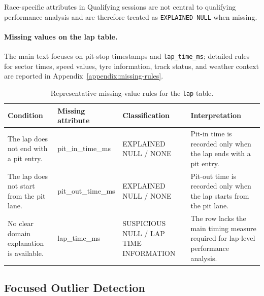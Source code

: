 \documentclass[11pt,a4paper]{article}
\begin{document}
	
	Race-specific attributes in Qualifying sessions are not central to qualifying performance analysis and are therefore treated as \texttt{EXPLAINED NULL} when missing.
	
	\paragraph{Missing values on the lap table.}
	The main text focuses on pit-stop timestamps and \texttt{lap\_time\_ms}; detailed rules for sector times, speed values, tyre information, track status, and weather context are reported in Appendix~\ref{appendix:missing-rules}.
	
	\begin{table}[H]
		\centering
		\small
		\caption{Representative missing-value rules for the \texttt{lap} table.}
		\label{tab:lap-missing-value-main-rules}
		\begin{tabularx}{\linewidth}{
				>{\raggedright\arraybackslash}p{3.8cm}
				>{\raggedright\arraybackslash}p{3.2cm}
				>{\raggedright\arraybackslash}p{3.4cm}
				>{\raggedright\arraybackslash}X
			}
			\toprule
			\textbf{Condition}
			& \textbf{Missing attribute}
			& \textbf{Classification}
			& \textbf{Interpretation} \\
			\midrule
			
			The lap does not end with a pit entry.
			& pit\_in\_time\_ms
			& EXPLAINED NULL / NONE
			& Pit-in time is recorded only when the lap ends with a pit entry. \\
			
			\midrule
			
			The lap does not start from the pit lane.
			& pit\_out\_time\_ms
			& EXPLAINED NULL / NONE
			& Pit-out time is recorded only when the lap starts from the pit lane. \\
			
			\midrule
			
			No clear domain explanation is available.
			& lap\_time\_ms
			& SUSPICIOUS NULL / LAP TIME INFORMATION
			& The row lacks the main timing measure required for lap-level performance analysis. \\
			
			\bottomrule
		\end{tabularx}
	\end{table}

	\subsection{Focused Outlier Detection}
	
\end{document}
